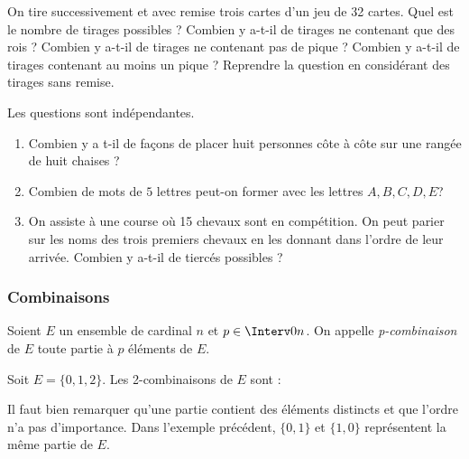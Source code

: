 \documentclass[a4paper,10pt]{report}
\begin{document}
\begin{ex}
On tire successivement et avec remise trois cartes d'un jeu de 32 cartes. Quel est le nombre de tirages possibles ? Combien y a-t-il de tirages ne contenant que des rois ? Combien y a-t-il de tirages ne contenant pas de pique ? Combien y a-t-il de tirages contenant au moins un pique ? Reprendre la question en considérant des tirages sans remise.

\vspace{9cm}
\end{ex}



\begin{exa} Les questions sont indépendantes.
\begin{enumerate}
\item Combien y a t-il de façons de placer huit personnes côte à côte sur une rangée de huit chaises ?
\item Combien de mots de $5$ lettres peut-on former avec les lettres $A,B,C,D,E$?
\item On assiste à une course où 15 chevaux sont en compétition. On peut parier sur les noms des trois premiers chevaux en les donnant dans l'ordre de leur arrivée. Combien y a-t-il de tiercés possibles ?
\end{enumerate}
\end{exa}

\subsubsection{Combinaisons}

\begin{defin}
Soient $E$ un ensemble de cardinal $n$ et $p \in \Interv 0n$. On appelle \textit{p-combinaison} de $E$ toute partie à $p$ éléments de $E$.
\end{defin}

\medskip

\begin{ex}
Soit $E= \lbrace 0,1,2 \rbrace$. Les 2-combinaisons de $E$ sont : 
\end{ex}

\medskip

\begin{att}
Il faut bien remarquer qu'une partie contient des éléments distincts et que l'ordre n'a pas d'importance. Dans l'exemple précédent, $\lbrace 0,1 \rbrace$ et $ \lbrace1,0 \rbrace$ représentent la même partie de $E$.
\end{att}
\end{document}
